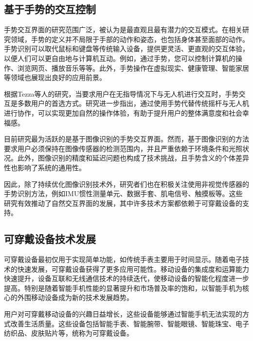 \subsection{基于手势的交互控制}

手势交互界面的研究范围广泛，被认为是最直观且最有潜力的交互模式。在相关研究领域，手势的定义并不局限于手部的动作和姿态，也包括身体甚至面部的动作\cites{wu2024gesture}。手势识别可以取代鼠标\cites{prasanth2023gesture}和键盘等传统输入设备，提供更灵活、更直观的交互体验，以便人们可以更自由地与计算机互动。例如，通过手势，您可以控制计算机的操作、浏览网页、播放音乐\cites{clement2021musical}等等。此外，手势操作在虚拟现实、健康管理、智能家居等领域也展现出良好的应用前景\cites{wu2024gesture}。

根据Tezza等人\cites{tezza2019state}的研究，当要求用户在无指导情况下与无人机进行交互时，手势交互是多数用户的首选方式。研究进一步指出，通过使用手势代替传统摇杆与无人机进行协作，可以实现更加自然的操作体验，有助于提升用户的整体满意度和社会幸福感。

目前研究最为活跃的是基于图像识别的手势交互界面\cites{mughees2020gesture,蔡成林0基于视觉,赫闻阳2020基于视觉,黑振全2022基于手势}。然而，基于图像识别的方法要求用户必须保持在图像传感器的检测范围内，并且严重依赖于环境条件和光照状况。此外，图像识别的精度和延迟问题也构成了技术挑战，且手势含义的个体差异性也影响了系统的通用性。

因此，除了持续优化图像识别技术外，研究者们也在积极关注使用非视觉传感器的手势识别方法，例如IMU惯性测量单元\cites{yau2020subtle,lee2023wearable,yoo2022motion}、数据手套\cites{bello2023captainglove,muezzinouglu2021intelligent}、肌电信号\cites{zheng2022surface}、触摸板\cites{yau2020subtle}等。这些研究有效推动了自然交互界面的发展，其中许多技术方案都依赖于可穿戴设备的支持。

\subsection{可穿戴设备技术发展}

可穿戴设备最初仅用于实现简单功能，如传统手表主要用于时间显示。随着电子技术的快速发展，可穿戴设备获得了更多应用可能性。移动设备的集成度和运算能力快速提升，设备互联和无线通信技术的持续迭代，使移动设备的智能化程度进一步提高。特别是随着智能手机性能的显著提升和市场普及率的饱和，以智能手机为核心的外围移动设备成为新的技术发展趋势。

用户对可穿戴移动设备的兴趣日益增长，这些设备能够通过智能手机无法实现的方式改善生活质量。这些设备包括智能手表、智能腕带、智能眼镜、智能珠宝、电子纺织品、皮肤贴片等，统称为可穿戴设备\cites{seneviratne2017survey}。

